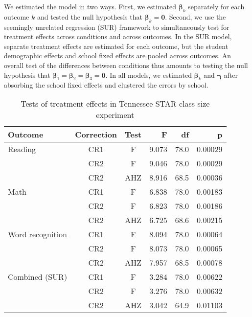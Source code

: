 \documentclass[12pt]{article}\usepackage[]{graphicx}\usepackage[]{color}
\newcommand{\bm}{\mathbf}
\newcommand{\bs}{\boldsymbol}
\begin{document}
We estimated the model in two ways. First, we estimated $\bs\beta_k$ separately for each outcome $k$ and tested the null hypothesis that $\bs\beta_k = \bm{0}$. Second, we use the seemingly unrelated regression (SUR) framework to simultaneously test for treatment effects across conditions and across outcomes. In the SUR model, separate treatment effects are estimated for each outcome, but the student demographic effects and school fixed effects are pooled across outcomes. An overall test of the differences between conditions thus amounts to testing the null hypothesis that $\bs\beta_1 = \bs\beta_2 = \bs\beta_3 = \bm{0}$. In all models, we estimated $\bs\beta_k$ and $\bs\gamma$ after absorbing the school fixed effects and clustered the errors by school.

\begin{table}[tbh]
\centering
\begin{tabular}{lccrrr}
  \toprule
Outcome & Correction & Test & F & df & p \\ 
  \midrule
Reading & CR1 & F & 9.073 & 78.0 & 0.00029 \\ 
   & CR2 & F & 9.046 & 78.0 & 0.00029 \\ 
   & CR2 & AHZ & 8.916 & 68.5 & 0.00036 \\ 
   \midrule
Math & CR1 & F & 6.838 & 78.0 & 0.00183 \\ 
   & CR2 & F & 6.823 & 78.0 & 0.00186 \\ 
   & CR2 & AHZ & 6.725 & 68.6 & 0.00215 \\ 
   \midrule
Word recognition & CR1 & F & 8.094 & 78.0 & 0.00064 \\ 
   & CR2 & F & 8.073 & 78.0 & 0.00065 \\ 
   & CR2 & AHZ & 7.957 & 68.5 & 0.00078 \\ 
   \midrule
Combined (SUR) & CR1 & F & 3.284 & 78.0 & 0.00622 \\ 
   & CR2 & F & 3.276 & 78.0 & 0.00632 \\ 
   & CR2 & AHZ & 3.042 & 64.9 & 0.01103 \\ 
   \bottomrule
\end{tabular}
\caption{Tests of treatment effects in Tennessee STAR class size experiment} 
\label{tab:STAR}
\end{table}
\end{document}
